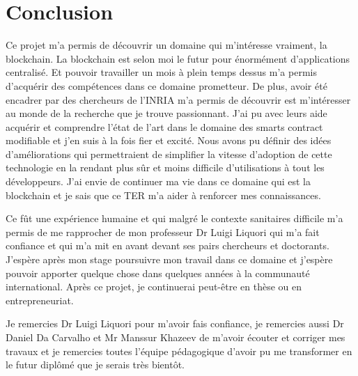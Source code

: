\section{Conclusion}

Ce projet m'a permis de découvrir un domaine qui m'intéresse vraiment, la blockchain. La blockchain est selon moi
le futur pour énormément d'applications centralisé. Et pouvoir travailler un mois à plein temps dessus m'a permis 
d'acquérir des compétences dans ce domaine prometteur. De plus, avoir été encadrer par des chercheurs de l'INRIA 
m'a permis de découvrir est m'intéresser au monde de la recherche que je trouve passionnant. J'ai pu avec leurs
aide acquérir et comprendre l'état de l'art dans le domaine des smarts contract modifiable et j'en suis à la fois
fier et excité. Nous avons pu définir des idées d'améliorations qui permettraient de simplifier la vitesse d'adoption
de cette technologie en la rendant plus sûr et moins difficile d'utilisations à tout les développeurs. J'ai
envie de continuer ma vie dans ce domaine qui est la blockchain et je sais que ce TER m'a aider à renforcer mes
connaissances. 

Ce fût une expérience humaine et qui malgré le contexte sanitaires difficile m'a permis de me rapprocher de mon 
professeur Dr Luigi Liquori qui m'a fait confiance et qui m'a mit en avant devant ses pairs chercheurs et doctorants.
J'espère après mon stage poursuivre mon travail dans ce domaine et j'espère pouvoir apporter quelque chose dans quelques
années à la communauté international. Après ce projet, je continuerai peut-être en thèse ou en entrepreneuriat. 

Je remercies Dr Luigi Liquori pour m'avoir fais confiance, je remercies aussi Dr Daniel Da Carvalho et Mr Manssur Khazeev
de m'avoir écouter et corriger mes travaux et je remercies toutes l'équipe pédagogique d'avoir pu me transformer en le 
futur diplômé que je serais très bientôt. 
